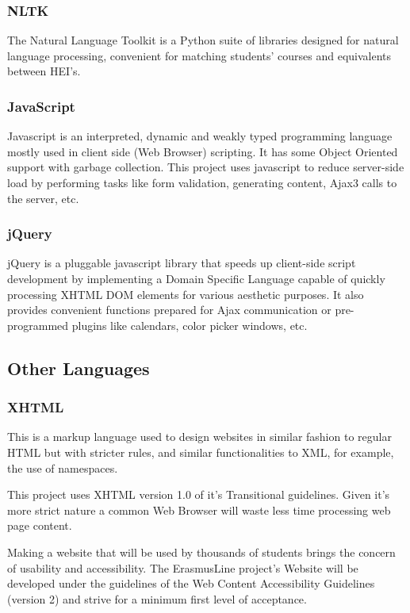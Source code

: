 \subsubsection{NLTK}

The Natural Language Toolkit is a Python suite of libraries designed for natural
language processing, convenient for matching students' courses and equivalents
between HEI's.

\subsubsection{JavaScript}

Javascript is an interpreted, dynamic and weakly typed programming language
mostly used in client side (Web Browser) scripting. It has some Object Oriented
support with garbage collection. This project uses javascript to reduce
server-side load by performing tasks like form validation, generating content,
Ajax3 calls to the server, etc.

\subsubsection{jQuery}

jQuery is a pluggable javascript library that speeds up client-side script
development by implementing a Domain Specific Language capable of quickly
processing XHTML DOM elements for various aesthetic purposes. It also provides
convenient functions prepared for Ajax communication or pre-programmed plugins
like calendars, color picker windows, etc. 

\subsection{Other Languages}
 
\subsubsection{XHTML}

This is a markup language used to design websites in similar fashion to regular
HTML but with stricter rules, and similar functionalities to XML, for example,
the use of namespaces. 

This project uses XHTML version 1.0 of it's Transitional
guidelines. Given it's more strict nature a common Web Browser will waste less
time processing web page content. 

Making a website that will be used by
thousands of students brings the concern of usability and accessibility. The
ErasmusLine project's Website will be developed under the guidelines of the Web
Content Accessibility Guidelines (version 2) and strive for a minimum first
level of acceptance. 

